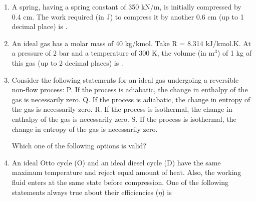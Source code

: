 \documentclass[a4paper,10pt]{article}
\begin{document}
\begin{enumerate}
    \item A spring, having a spring constant of 350 kN/m, is initially compressed by 0.4 cm. The work required (in J) to compress it by another 0.6 cm (up to 1 decimal place) is \underline{\hspace{2cm}}.
    \hfill{}

    \item An ideal gas has a molar mass of 40 kg/kmol. Take R = 8.314 kJ/kmol.K. At a pressure of 2 bar and a temperature of 300 K, the volume (in m$^3$) of 1 kg of this gas (up to 2 decimal places) is \underline{\hspace{2cm}}.
    \hfill{}

    \item Consider the following statements for an ideal gas undergoing a reversible non-flow process:
    P. If the process is adiabatic, the change in enthalpy of the gas is necessarily zero.
    Q. If the process is adiabatic, the change in entropy of the gas is necessarily zero.
    R. If the process is isothermal, the change in enthalpy of the gas is necessarily zero.
    S. If the process is isothermal, the change in entropy of the gas is necessarily zero.
    
    Which one of the following options is valid?
    \hfill{}
    \begin{enumerate}[label=\Alph*)]
    \end{enumerate}

    \item An ideal Otto cycle (O) and an ideal diesel cycle (D) have the same maximum temperature and reject equal amount of heat. Also, the working fluid enters at the same state before compression. One of the following statements always true about their efficiencies ($\eta$) is
    \hfill{}
    \begin{enumerate}[label=\Alph*)]
    \end{enumerate}


\end{enumerate}
\end{document}
